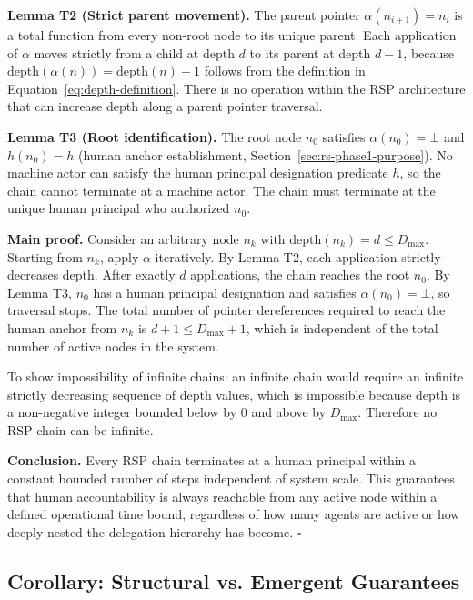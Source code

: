 \medskip
\noindent\textbf{Lemma T2 (Strict parent movement).} The parent pointer $\alpha(n_{i+1}) = n_i$ is a total function from every non-root node to its unique parent. Each application of $\alpha$ moves strictly from a child at depth $d$ to its parent at depth $d - 1$, because $\text{depth}(\alpha(n)) = \text{depth}(n) - 1$ follows from the definition in Equation~\ref{eq:depth-definition}. There is no operation within the RSP architecture that can increase depth along a parent pointer traversal.

\medskip
\noindent\textbf{Lemma T3 (Root identification).} The root node $n_0$ satisfies $\alpha(n_0) = \bot$ and $h(n_0) = h$ (human anchor establishment, Section~\ref{sec:rs-phase1-purpose}). No machine actor can satisfy the human principal designation predicate $h$, so the chain cannot terminate at a machine actor. The chain must terminate at the unique human principal who authorized $n_0$.

\medskip
\noindent\textbf{Main proof.} Consider an arbitrary node $n_k$ with $\text{depth}(n_k) = d \leq D_{\max}$. Starting from $n_k$, apply $\alpha$ iteratively. By Lemma T2, each application strictly decreases depth. After exactly $d$ applications, the chain reaches the root $n_0$. By Lemma T3, $n_0$ has a human principal designation and satisfies $\alpha(n_0) = \bot$, so traversal stops. The total number of pointer dereferences required to reach the human anchor from $n_k$ is $d + 1 \leq D_{\max} + 1$, which is independent of the total number of active nodes in the system.

To show impossibility of infinite chains: an infinite chain would require an infinite strictly decreasing sequence of depth values, which is impossible because depth is a non-negative integer bounded below by 0 and above by $D_{\max}$. Therefore no RSP chain can be infinite.

\medskip
\noindent\textbf{Conclusion.} Every RSP chain terminates at a human principal within a constant bounded number of steps independent of system scale. This guarantees that human accountability is always reachable from any active node within a defined operational time bound, regardless of how many agents are active or how deeply nested the delegation hierarchy has become. $\square$

\subsection{Corollary: Structural vs. Emergent Guarantees}
\label{sec:rs-corollary}

